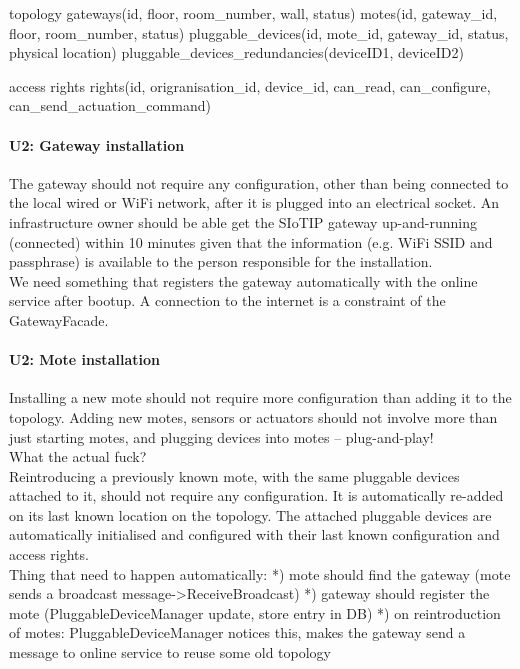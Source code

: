     topology
        gateways(id, floor, room_number, wall, status)
        motes(id, gateway_id, floor, room_number, status)
        pluggable_devices(id, mote_id, gateway_id, status, physical location)
        pluggable_devices_redundancies(deviceID1, deviceID2)

    access rights
        rights(id, origranisation_id, device_id, can_read, can_configure, can_send_actuation_command)

    \paragraph{U2: Gateway installation}
        The gateway should not require any configuration, other than being connected
        to the local wired or WiFi network, after it is plugged into an electrical
        socket. An infrastructure owner should be able get the SIoTIP gateway
        up-and-running (connected) within 10 minutes given that the information
        (e.g. WiFi SSID and passphrase) is available to the person responsible for
        the installation. \\
        We need something that registers the gateway automatically with the
        online service after bootup. A connection to the internet is a constraint
        of the GatewayFacade.

    \paragraph{U2: Mote installation}
        Installing a new mote should not require more configuration than adding it
        to the topology. Adding new motes, sensors or actuators should not involve
        more than just starting motes, and plugging devices into motes – plug-and-play! \\
        What the actual fuck? \\
        Reintroducing a previously known mote, with the same pluggable devices attached to it,
        should not require any configuration. It is automatically re-added on
        its last known location on the topology. The attached pluggable devices
        are automatically initialised and configured with their last known
        configuration and access rights. \\
        Thing that need to happen automatically:
        *) mote should find the gateway (mote sends a broadcast message->ReceiveBroadcast)
        *) gateway should register the mote (PluggableDeviceManager update, store entry in DB)
        *) on reintroduction of motes: PluggableDeviceManager notices this, makes the gateway send a message to online service to reuse some old topology

